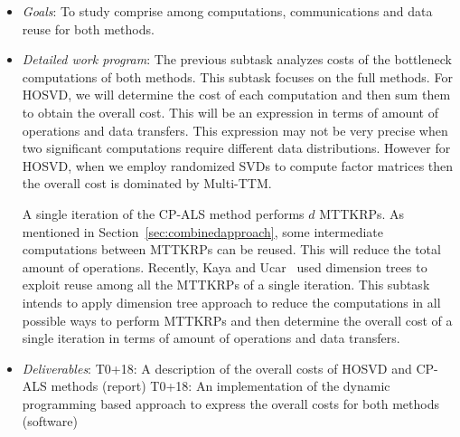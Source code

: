 \documentclass[a4paper,11pt]{article}
\newcommand{\goal}{{\color{orange2}  \emph{Goals}:} }
\newcommand{\dwp}{{\color{orange2}  \emph{Detailed work program}: }}
\newcommand{\deliverables}{{\color{orange2}  \emph{Deliverables}: }}
\begin{document}
	\begin{itemize}[leftmargin=-1pt]
		\item[] \goal To study comprise among computations, communications and data reuse for both methods. 
		\item[] \dwp The previous subtask analyzes costs of the bottleneck computations of both methods. This subtask focuses on the full methods. For HOSVD, we will determine the cost of each computation and then sum them to obtain the overall cost. This will be an expression in terms of amount of operations and data transfers. This expression may not be very precise when two significant computations require different data distributions. However for HOSVD, when we employ randomized SVDs to compute factor matrices then the overall cost is dominated by Multi-TTM.
		
		A single iteration of the CP-ALS method performs $d$ MTTKRPs. As mentioned in Section~\ref{sec:combinedapproach}, some intermediate computations between MTTKRPs can be reused. This will reduce the total amount of operations. Recently, Kaya and Ucar~\cite{KU-SISC-2018} used dimension trees to exploit reuse among all the MTTKRPs of a single iteration. This subtask intends to apply dimension tree approach to reduce the computations in all possible ways to perform MTTKRPs and then determine the overall cost of a single iteration in terms of amount of operations and data transfers.
		\item[] \deliverables T0+18: A description of the overall costs of HOSVD and CP-ALS methods (report)\newline
		T0+18: An implementation of the dynamic programming based approach to express the overall costs for both methods (software)
	\end{itemize}
	
\end{document}
